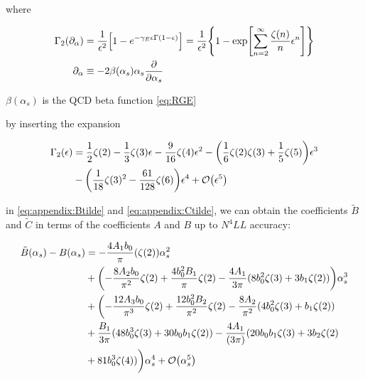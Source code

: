 \documentclass[../main.tex]{subfiles}
\begin{document}
where 

\begin{align}
    \Gamma_2(\partial_\alpha) &= \frac{1}{\epsilon^2}\qty[1-e^{-\gamma_E \epsilon \Gamma(1-\epsilon)}] = \frac{1}{\epsilon^2}\qty{1-\exp[\sum_{n=2}^\infty \frac{\zeta(n)}{n}\epsilon^n] }\\
    \partial_\alpha &\equiv -2\beta(\alpha_s)\alpha_s \pdv{\alpha_s}
\end{align}

$\beta(\alpha_s)$ is the QCD beta function \cref{eq:RGE}

by inserting the expansion 

\begin{align}
    \begin{split}
    \Gamma_2(\epsilon) &= \frac{1}{2}\zeta(2) -\frac{1}{3}\zeta(3) \epsilon - \frac{9}{16}\zeta(4) \epsilon^2 - \qty(\frac{1}{6}\zeta(2)\zeta(3)+ \frac{1}{5}\zeta(5))\epsilon^3 \\
    &- \qty(\frac{1}{18}\zeta(3)^2 - \frac{61}{128}\zeta(6))\epsilon^4 + \order{\epsilon^5}   
    \end{split}
\end{align}

in \cref{eq:appendix:Btilde} and \cref{eq:appendix:Ctilde}, we can obtain the coefficients $\tilde{B}$ and $\tilde{C}$ in terms of the coefficients $A$ and $B$ up to $N^4LL$ accuracy: 

\begin{align}
    \begin{split}
    \tilde{B}(\alpha_s) - B(\alpha_s) &= -\frac{4 A_1 b_0}{\pi} (\zeta(2)) \alpha_s^2 \\
    &+ \qty(-\frac{8 A_2 b_0}{\pi^2} \zeta(2) + \frac{4 b_0^2 B_1}{\pi} \zeta(2) - \frac{4 A_1}{3\pi}(8 b_0^2 \zeta(3) + 3 b_1 \zeta(2))) \alpha_s^3 \\
    &+ \biggl(-\frac{12 A_3 b_0}{\pi^3} \zeta(2) + \frac{12 b_0^2 B_2}{\pi^2} \zeta(2) - \frac{8 A_2}{\pi^2} (4 b_0^2 \zeta(3) + b_1 \zeta(2)) \\
    &+ \frac{B_1}{3 \pi}(48 b_0^3 \zeta(3) +  30 b_0 b_1 \zeta(2)) - \frac{4 A_1}{(3 \pi)} (20 b_0 b_1 \zeta(3) + 3 b_2 \zeta(2) \\
    &+ 81 b_0^3 \zeta(4)) \biggr) \alpha_s^4 + \order{\alpha_s^5}
    \end{split}
\end{align}

\end{document}
